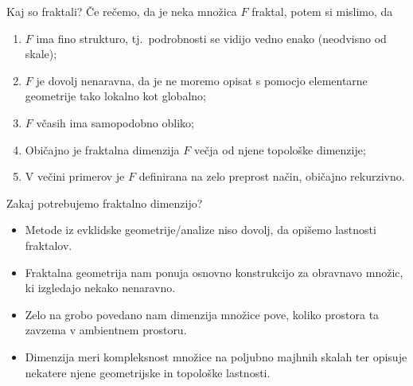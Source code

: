 \documentclass[10pt]{beamer}
\begin{document}
\begin{frame}{Kaj so fraktali?}
    Če rečemo, da je neka množica \(F\) fraktal, potem si mislimo, da
    \begin{enumerate}
        \item \(F\) ima fino strukturo, tj.\ podrobnosti se vidijo vedno enako (neodvisno od skale);
        \item \(F\) je dovolj nenaravna, da je ne moremo opisat s pomocjo elementarne geometrije tako lokalno kot globalno;
        \item \(F\) včasih ima samopodobno obliko;
        \item Običajno je fraktalna dimenzija \(F\) večja od njene topološke dimenzije;
        \item V večini primerov  je \(F\) definirana na zelo preprost način, običajno rekurzivno.
    \end{enumerate}   
\end{frame}

\begin{frame}{Zakaj potrebujemo fraktalno dimenzijo?}
    \begin{itemize}
        \item Metode iz evklidske geometrije/analize niso dovolj, da opišemo lastnosti fraktalov.
        \item Fraktalna geometrija nam ponuja osnovno konstrukcijo za obravnavo množic, ki izgledajo nekako nenaravno.
        \item Zelo na grobo povedano nam dimenzija množice pove, koliko prostora ta zavzema v ambientnem prostoru. 
        \item Dimenzija meri kompleksnost množice na poljubno majhnih skalah ter opisuje nekatere njene geometrijske in topološke lastnosti.
    \end{itemize}    
\end{frame}

\end{document}
